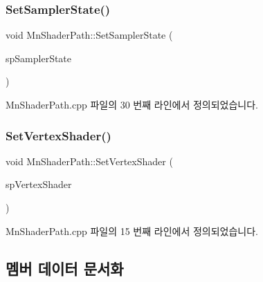 \subsubsection{\texorpdfstring{Set\+Sampler\+State()}{SetSamplerState()}}
{\footnotesize\ttfamily void Mn\+Shader\+Path\+::\+Set\+Sampler\+State (\begin{DoxyParamCaption}\item[{const std\+::shared\+\_\+ptr$<$ \hyperlink{class_m_n_l_1_1_mn_sampler_state}{Mn\+Sampler\+State} $>$ \&}]{sp\+Sampler\+State }\end{DoxyParamCaption})\hspace{0.3cm}{\ttfamily [protected]}}



Mn\+Shader\+Path.\+cpp 파일의 30 번째 라인에서 정의되었습니다.

\mbox{\label{class_m_n_l_1_1_mn_shader_path_ace035d94a5fccba00c4a52e48f5b26d2}} 
\subsubsection{\texorpdfstring{Set\+Vertex\+Shader()}{SetVertexShader()}}
{\footnotesize\ttfamily void Mn\+Shader\+Path\+::\+Set\+Vertex\+Shader (\begin{DoxyParamCaption}\item[{const std\+::shared\+\_\+ptr$<$ \hyperlink{class_m_n_l_1_1_mn_vertex_shader}{Mn\+Vertex\+Shader} $>$ \&}]{sp\+Vertex\+Shader }\end{DoxyParamCaption})\hspace{0.3cm}{\ttfamily [protected]}}



Mn\+Shader\+Path.\+cpp 파일의 15 번째 라인에서 정의되었습니다.



\subsection{멤버 데이터 문서화}
\mbox{\label{class_m_n_l_1_1_mn_shader_path_ab1a5cabc3bc0c0a19e2dd074ba8e0eb1}} 
